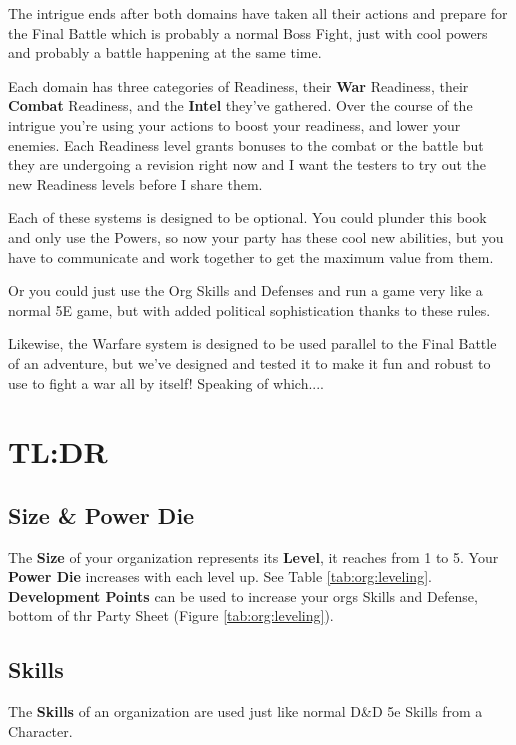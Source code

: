\documentclass[letterpaper,twocolumn,openany,nodeprecatedcode]{dndbook}
\begin{document}
The intrigue ends after both domains have taken all their actions and prepare for the Final Battle which is probably a normal Boss Fight, just with cool powers and probably a battle happening at the same time.

Each domain has three categories of Readiness, their \textbf{War} Readiness, their \textbf{Combat} Readiness, and the \textbf{Intel} they’ve gathered.
Over the course of the intrigue you’re using your actions to boost your readiness, and lower your enemies.
Each Readiness level grants bonuses to the combat or the battle but they are undergoing a revision right now and I want the testers to try out the new Readiness levels before I share them.

Each of these systems is designed to be optional.
You could plunder this book and only use the Powers, so now your party has these cool new abilities, but you have to communicate and work together to get the maximum value from them.

Or you could just use the Org Skills and Defenses and run a game very like a normal 5E game, but with added political sophistication thanks to these rules.

Likewise, the Warfare system is designed to be used parallel to the Final Battle of an adventure, but we’ve designed and tested it to make it fun and robust to use to fight a war all by itself!
Speaking of which....

\pagebreak

\section{TL:DR}

\subsection{Size \& Power Die}
The \textbf{Size} of your organization represents its \textbf{Level}, it reaches from 1 to 5.
Your \textbf{Power Die} increases with each level up. See Table \ref{tab:org:leveling}.
\textbf{Development Points} can be used to increase your orgs Skills and Defense, bottom of thr Party Sheet (Figure \ref{tab:org:leveling}).

\subsection{Skills}
The \textbf{Skills} of an organization are used just like normal D\&D 5e Skills from a Character.
\end{document}
